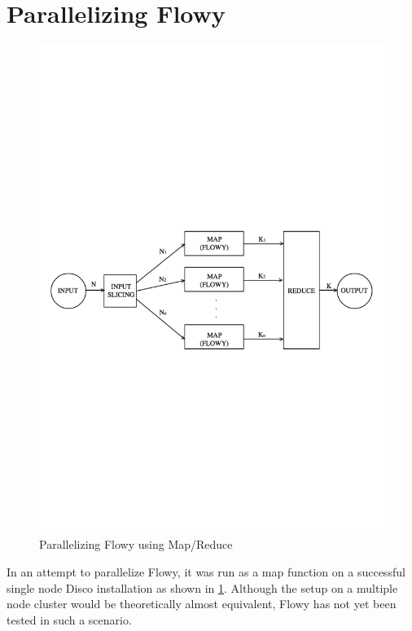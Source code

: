 \section{Parallelizing Flowy}\label{sec:parallel-flowy}
\begin{figure}[h!]
\begin{center}
  \includegraphics* [width=1.0\linewidth]{figures/flowy-mapreduce}	
  \caption{Parallelizing Flowy using Map/Reduce \cite{pnemeth:thesis:2010}}
  \label{fig:flowy-mapreduce}
\end{center}
\end{figure}
In an attempt to parallelize Flowy, it was run as a map function on a successful single node Disco installation as shown in \ref{fig:flowy-mapreduce}. Although the setup on a multiple node cluster would be theoretically almost equivalent, Flowy has not yet been tested in such a scenario.
	
